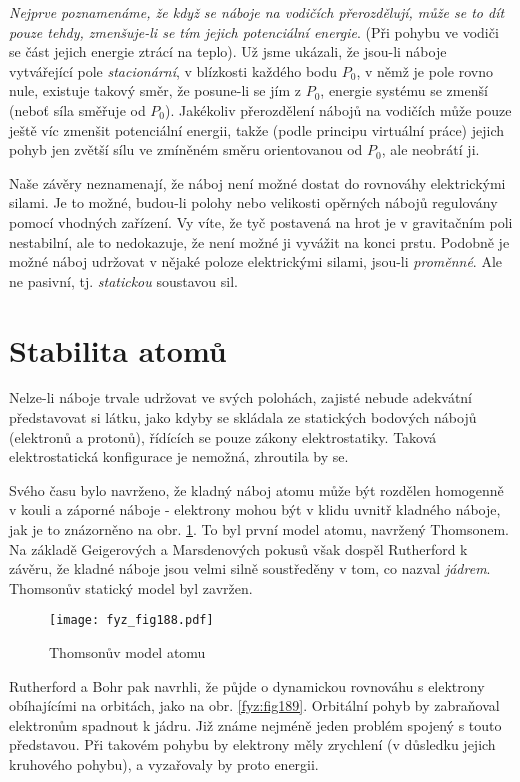   \emph{Nejprve poznamenáme, že když se náboje na vodičích přerozdělují, může se to dít pouze tehdy,
  zmenšuje-li se tím jejich potenciální energie}. (Při pohybu ve vodiči se část jejich energie
  ztrácí na teplo). Už jsme ukázali, že jsou-li náboje vytvářející pole \emph{stacionární}, v
  blízkosti každého bodu \(P_0\), v němž je pole rovno nule, existuje takový směr, že posune-li se
  jím z \(P_0\), energie systému se zmenší (neboť síla směřuje od \(P_0\)). Jakékoliv přerozdělení
  nábojů na vodičích může pouze ještě víc zmenšit potenciální energii, takže (podle principu
  virtuální práce) jejich pohyb jen zvětší sílu ve zmíněném směru orientovanou od \(P_0\), ale
  neobrátí ji.
  
  Naše závěry neznamenají, že náboj není možné dostat do rovnováhy elektrickými silami. Je to možné,
  budou-li polohy nebo velikosti opěrných nábojů regulovány pomocí vhodných zařízení. Vy víte, že
  tyč postavená na hrot je v gravitačním poli nestabilní, ale to nedokazuje, že není možné ji
  vyvážit na konci prstu. Podobně je možné náboj udržovat v nějaké poloze elektrickými silami,
  jsou-li \emph{proměnné}. Ale ne pasivní, tj. \emph{statickou} soustavou sil.

\section{Stabilita atomů}\label{fyz:IIchapVsecIII}
  Nelze-li náboje trvale udržovat ve svých polohách, zajisté nebude adekvátní představovat si látku,
  jako kdyby se skládala ze statických bodových nábojů (elektronů a protonů), řídících se pouze
  zákony elektrostatiky. Taková elektrostatická konfigurace je nemožná, zhroutila by se.
  
  Svého času bylo navrženo, že kladný náboj atomu může být rozdělen homogenně v kouli a záporné
  náboje - elektrony mohou být v klidu uvnitř kladného náboje, jak je to znázorněno na obr.
  \ref{fyz:fig188}. To byl první model atomu, navržený Thomsonem. Na základě Geigerových a
  Marsdenových pokusů však dospěl Rutherford k závěru, že kladné náboje jsou velmi silně soustředěny
  v tom, co nazval \emph{jádrem}. Thomsonův statický model byl zavržen.
  \begin{figure}[ht!] %
    \centering
    \texttt{[image: fyz\_fig188.pdf]}
    \caption{Thomsonův model atomu}
    \label{fyz:fig188}
  \end{figure}
  
  Rutherford a Bohr pak navrhli, že půjde o dynamickou rovnováhu s elektrony obíhajícími na 
  orbitách, jako na obr. \ref{fyz:fig189}. Orbitální pohyb by zabraňoval 
  elektronům spadnout k jádru. Již známe nejméně jeden problém spojený s touto představou. Při 
  takovém pohybu by elektrony měly zrychlení (v důsledku jejich kruhového pohybu), a vyzařovaly 
  by proto energii.
  
